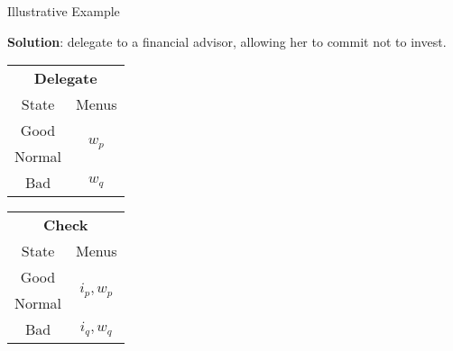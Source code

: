 \documentclass[usenames,dvipsnames,aspectratio=169,11pt, envcountsect, handout]{beamer}
\begin{document}
\begin{frame}[noframenumbering]{Illustrative Example}

	\textbf{Solution}: delegate to a financial advisor, allowing her to commit not to invest. \pause

	\vfill

	\begin{table}[H]
		\centering
		\begin{minipage}{0.29\textwidth}
			\centering
			\begin{tabular}{c | c}
				\multicolumn{2}{c}{\textbf{Delegate}}                           \\
				State                & Menus                                    \\
				\hline
				{\color{blue}Good}   & \multirow{2}{*}{{\color{blue}\( w_p \)}} \\
				{\color{blue}Normal} &                                          \\
				\hline
				Bad                  & \( w_q \)                                \\
			\end{tabular}
			\vspace{0.5cm} %
		\end{minipage}\hspace{0.5cm} %
		\begin{minipage}{0.29\textwidth}
			\centering
			\begin{tabular}{c | c}
				\multicolumn{2}{c}{\textbf{Check}}                                     \\
				State                & Menus                                           \\
				\hline
				{\color{blue}Good}   & \multirow{2}{*}{{\color{blue}\( i_{p}, w_p \)}} \\
				{\color{blue}Normal} &                                                 \\
				\hline
				Bad                  & \(  i_{q}, w_q \)                               \\
			\end{tabular}
			\vspace{0.5cm} %
		\end{minipage}\hspace{0.5cm} %

\end{table}
\end{frame}
\end{document}
